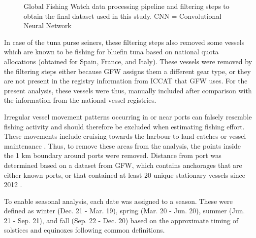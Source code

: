 \begin{figure}[htp]
\begin{center}
	\end{center}
	\caption{Global Fishing Watch data processing pipeline and filtering steps to obtain the final dataset used in this study. CNN = Convolutional Neural Network}
	\label{fig:workflow}
\end{figure}

\medskip

In case of the tuna purse seiners, these filtering steps also removed some vessels which are known
to be fishing for bluefin tuna based on national quota allocations (obtained for Spain, France, and
Italy). These vessels were removed by the filtering steps either because GFW assigns them a
different gear type, or they are not present in the registry information from ICCAT that GFW uses.
For the present analysis, these vessels were thus, manually included after comparison with the
information from the national vessel registries.

\medskip

Irregular vessel movement patterns occurring in or near ports can falsely resemble fishing activity
and should therefore be excluded when estimating fishing effort. These movements include cruising
towards the harbour to land catches or vessel maintenance \citep{souza}. Thus, to remove these
areas from the analysis, the points inside the 1 km boundary around ports were removed. Distance
from port was determined based on a dataset from GFW, which contains anchorages that are either
known ports, or that contained at least 20 unique stationary vessels since 2012
\citep{gfw_distance}.

\medskip

To enable seasonal analysis, each date was assigned to a season. These were defined as winter (Dec.
21 - Mar. 19), spring (Mar. 20 - Jun. 20), summer (Jun. 21 - Sep. 21), and fall (Sep. 22 - Dec. 20)
based on the approximate timing of solstices and equinoxes following common definitions.

